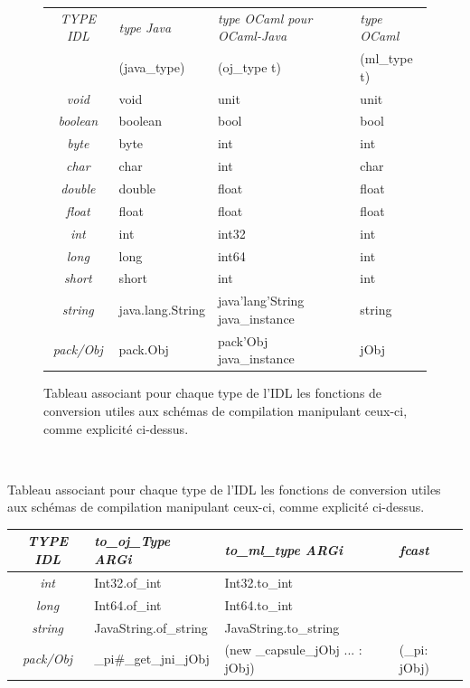 \documentclass[a4paper, 11pt]{article}
\begin{document}
\begin{figure}
\centering
\begin{tabular}{|c|l|l|l|}
 \hline
\emph{TYPE IDL} & \emph{type Java} &\emph{ type OCaml pour OCaml-Java} & \emph{type OCaml} \\
& (java\_type) & (oj\_type t) & (ml\_type t) \\
 \hline
\emph{void} & void & unit & unit\\
\emph{boolean} &boolean & bool & bool\\
\emph{byte} & byte & int & int \\
\emph{char} &char & int & char\\
\emph{double} & double & float & float\\
\emph{float} & float & float & float\\
\emph{int} & int & int32 & int\\
\emph{long} & long & int64 & int\\
\emph{short} & short & int & int\\
\emph{string} & java.lang.String & java'lang'String java\_instance & string\\
\emph{pack/Obj} & pack.Obj & pack'Obj java\_instance & jObj\\
 \hline
\end{tabular}
\caption{Tableau associant pour chaque type de l'IDL les
fonctions de conversion utiles aux schémas de compilation manipulant ceux-ci, comme explicité ci-dessus.}
\end{figure}
\
\newline

Tableau associant pour chaque type de l'IDL les
fonctions de conversion utiles aux schémas de compilation manipulant ceux-ci, comme explicité ci-dessus. 

\begin{tabular}{|c|l|l|l|}
  \hline
  \emph{TYPE IDL} & \emph{to\_oj\_Type ARGi} & \emph{to\_ml\_type ARGi} & \emph{fcast}\\
  \hline

 \emph{int} & Int32.of\_int\ & Int32.to\_int & \\
 \emph{long} & Int64.of\_int & Int64.to\_int & \\
 
 \emph{string} & JavaString.of\_string & JavaString.to\_string & \\
 \emph{pack/Obj} & \_pi\#\_get\_jni\_jObj & (new \_capsule\_jObj ... : jObj) & (\_pi: jObj)\\
  \hline
\end{tabular}
\end{document}
